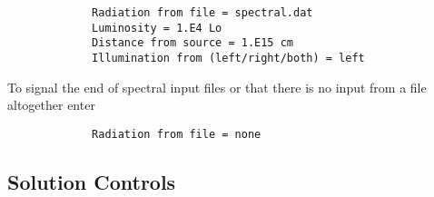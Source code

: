 \documentclass[12pt]{article}
\def\separation {0.5cm}
\begin{document}
\vspace{\separation}
\begin{verbatim}
             Radiation from file = spectral.dat
             Luminosity = 1.E4 Lo
             Distance from source = 1.E15 cm
             Illumination from (left/right/both) = left
\end{verbatim}
To signal the end of spectral input files or that there is no input from a file
altogether enter
\begin{verbatim}
             Radiation from file = none
\end{verbatim}

\subsection{Solution Controls}
\end{document}
